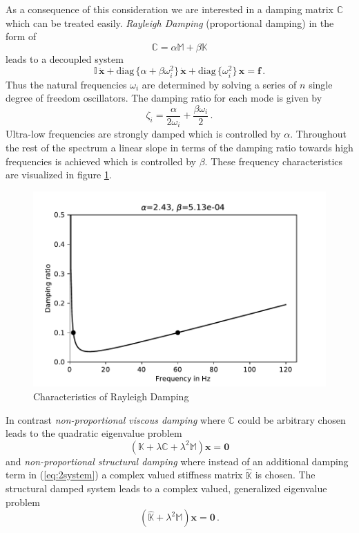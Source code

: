\documentclass[conference]{journal}
\newcommand{\bb}[1]{\mathbb{#1}}
\newcommand{\B}[1]{\mathbf{#1}}
\newcommand{\Bx}{\B{x}}
\newcommand{\M}{\bb{M}}
\newcommand{\C}{\bb{C}}
\newcommand{\K}{\bb{K}}
\begin{document}
	As a consequence of this consideration we are interested in a damping matrix $\C$ which can be treated easily. \textit{Rayleigh Damping} (proportional damping) in the form of
	\begin{equation} \label{rayleigh}
	\C = \alpha \M + \beta \K
	\end{equation}
	leads to a decoupled system
	\begin{equation} \label{rayleigh-decoupled-system}
	\bb{I}\,\ddot{\Bx} + \mathrm{diag}\,\{ \alpha + \beta \omega_i^2 \}\,\dot{\Bx} + \mathrm{diag}\,\{ \omega_i^2 \}\,\Bx = \B{f}
	\,.
	\end{equation}
	Thus the natural frequencies $\omega_i$ are determined by solving a series of $n$ single degree of freedom oscillators. The damping ratio for each mode is given by
	\begin{equation} \label{damping-ratio}
	\zeta_i = \frac{\alpha}{2 \omega_i} + \frac{\beta \omega_i}{2}
	\,.
	\end{equation}
	Ultra-low frequencies are strongly damped which is controlled by $\alpha$. Throughout the rest of the spectrum a linear slope in terms of the damping ratio towards high frequencies is achieved which is controlled by $\beta$. These frequency characteristics are visualized in figure \ref{fig:rayleigh}.

	\begin{figure}[h]
	\centering
	\includegraphics[width=.8\columnwidth]{./figures/rayleigh.pdf}
	\caption{Characteristics of Rayleigh Damping}
	\label{fig:rayleigh}
	\end{figure}

	In contrast \textit{non-proportional viscous damping} where $\C$ could be arbitrary chosen leads to the quadratic eigenvalue problem
	\begin{equation} \label{quadratic-eigenvalue-problem}
	\left(  \K + \lambda \C + \lambda^2 \M \right) \Bx = \B{0}
	\end{equation}
	and \textit{non-proportional structural damping} where instead of an additional damping term in (\ref{eq:2system}) a complex valued stiffness matrix $\hat{\K}$ is chosen. The structural damped system leads to a complex valued, generalized eigenvalue problem
	\begin{equation} \label{structural-damped}
	\left(  \hat{\K} + \lambda^2 \M \right) \Bx = \B{0}\,.
	\end{equation}
	
\end{document}
